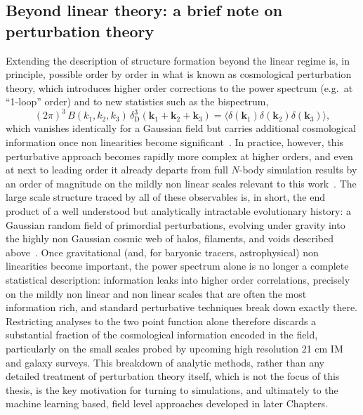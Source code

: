 \subsection{Beyond linear theory: a brief note on perturbation theory}

Extending the description of structure formation beyond the linear regime is, in principle, possible order by order in what is known as cosmological perturbation theory, which introduces higher order corrections to the power spectrum (e.g.\ at ``1-loop'' order) and to new statistics such as the bispectrum,
\begin{equation}
    (2\pi)^3\,B(k_1,k_2,k_3)\,\delta_\text{D}^3(\bm{k}_1+\bm{k}_2+\bm{k}_3) = \langle\delta(\bm{k}_1)\delta(\bm{k}_2)\delta(\bm{k}_3)\rangle,
\end{equation}
which vanishes identically for a Gaussian field but carries additional cosmological information once non linearities become significant~\citep{sefu06}. In practice, however, this perturbative approach becomes rapidly more complex at higher orders, and even at next to leading order it already departs from full $N$-body simulation results by an order of magnitude on the mildly non linear scales relevant to this work~\citep{Chudaykin_2020}. The large scale structure traced by all of these observables is, in short, the end product of a well understood but analytically intractable evolutionary history: a Gaussian random field of primordial perturbations, evolving under gravity into the highly non Gaussian cosmic web of halos, filaments, and voids described above~\citep[e.g.][]{obuljen23,villaescusa-navarro_ingredients_2018}. Once gravitational (and, for baryonic tracers, astrophysical) non linearities become important, the power spectrum alone is no longer a complete statistical description: information leaks into higher order correlations, precisely on the mildly non linear and non linear scales that are often the most information rich, and standard perturbative techniques break down exactly there. Restricting analyses to the two point function alone therefore discards a substantial fraction of the cosmological information encoded in the field, particularly on the small scales probed by upcoming high resolution 21 cm IM and galaxy surveys. This breakdown of analytic methods, rather than any detailed treatment of perturbation theory itself, which is not the focus of this thesis, is the key motivation for turning to simulations, and ultimately to the machine learning based, field level approaches developed in later Chapters.

